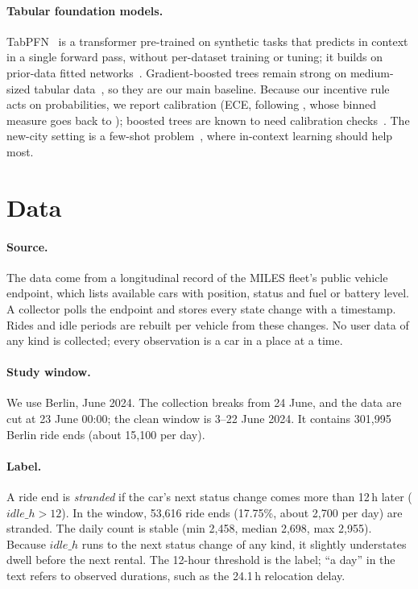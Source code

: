 \documentclass[11pt,a4paper]{article}
\begin{document}
\paragraph{Tabular foundation models.} TabPFN~\citep{hollmann2023tabpfn,hollmann2025tabpfn} is a transformer pre-trained on synthetic tasks that predicts in context in a single forward pass, without per-dataset training or tuning; it builds on prior-data fitted networks~\citep{muller2022transformers}. Gradient-boosted trees remain strong on medium-sized tabular data~\citep{grinsztajn2022why}, so they are our main baseline. Because our incentive rule acts on probabilities, we report calibration (ECE, following \citet{guo2017calibration}, whose binned measure goes back to \citet{naeini2015bbq}); boosted trees are known to need calibration checks~\citep{niculescu2005predicting}. The new-city setting is a few-shot problem~\citep{hospedales2022metalearning,nam2023stunt}, where in-context learning should help most.

\section{Data}\label{sec:data}

\paragraph{Source.} The data come from a longitudinal record of the MILES fleet's public vehicle endpoint, which lists available cars with position, status and fuel or battery level. A collector polls the endpoint and stores every state change with a timestamp. Rides and idle periods are rebuilt per vehicle from these changes. No user data of any kind is collected; every observation is a car in a place at a time.

\paragraph{Study window.} We use Berlin, June 2024. The collection breaks from 24 June, and the data are cut at 23 June 00:00; the clean window is 3--22 June 2024. It contains 301,995 Berlin ride ends (about 15,100 per day).

\paragraph{Label.} A ride end is \emph{stranded} if the car's next status change comes more than 12\,h later ($\mathit{idle\_h} > 12$). In the window, 53,616 ride ends (17.75\%, about 2,700 per day) are stranded. The daily count is stable (min 2,458, median 2,698, max 2,955). Because $\mathit{idle\_h}$ runs to the next status change of any kind, it slightly understates dwell before the next rental. The 12-hour threshold is the label; ``a day'' in the text refers to observed durations, such as the 24.1\,h relocation delay.
\end{document}
